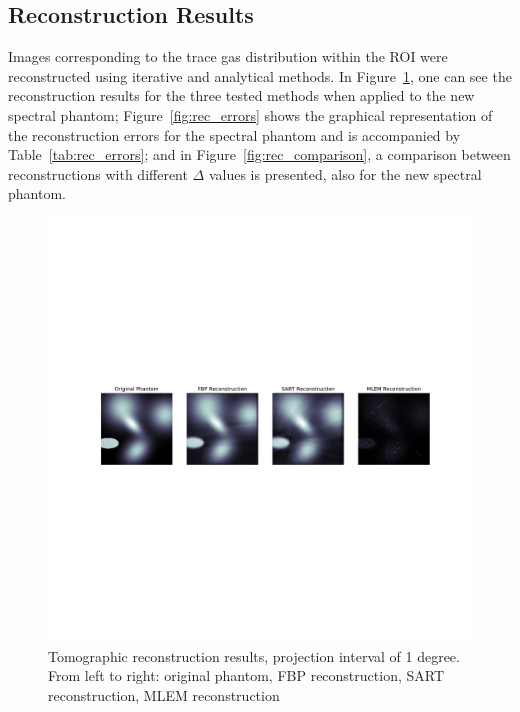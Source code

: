 \subsection{Reconstruction Results}%
\label{sub:reconstruction_results}

Images corresponding to the trace gas distribution within the ROI were
reconstructed using iterative and analytical methods. In
Figure~\ref{fig:rec_results}, one can see the reconstruction results for
the three tested methods when applied to the new spectral phantom;
Figure~\ref{fig:rec_errors} shows the graphical representation of the
reconstruction errors for the spectral phantom and is accompanied by
Table~\ref{tab:rec_errors}; and in Figure~\ref{fig:rec_comparison}, a
comparison between reconstructions with different $\Delta$ values is
presented, also for the new spectral phantom. 

\begin{figure}[t]
    \centering
    \includegraphics[clip, trim=4cm 15cm 3cm 14cm,
    width=\textwidth]{img/pdf/rec_compilation_1.pdf}
    \caption{Tomographic reconstruction results, projection interval of
    1 degree. From left to right: original phantom, FBP reconstruction,
    SART reconstruction, MLEM reconstruction}
    \label{fig:rec_results}
\end{figure}

